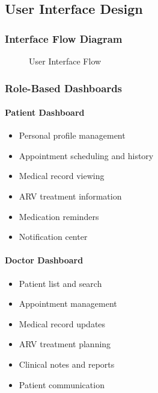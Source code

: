 \documentclass[12pt,a4paper]{article}
\begin{document}
\subsection{User Interface Design}

\subsubsection{Interface Flow Diagram}

\begin{figure}[H]
\centering
{}
\caption{User Interface Flow}
\label{fig:ui-flow}
\end{figure}

\subsubsection{Role-Based Dashboards}

\paragraph{Patient Dashboard}
\begin{itemize}
    \item Personal profile management
    \item Appointment scheduling and history
    \item Medical record viewing
    \item ARV treatment information
    \item Medication reminders
    \item Notification center
\end{itemize}

\paragraph{Doctor Dashboard}
\begin{itemize}
    \item Patient list and search
    \item Appointment management
    \item Medical record updates
    \item ARV treatment planning
    \item Clinical notes and reports
    \item Patient communication
\end{itemize}
\end{document}
